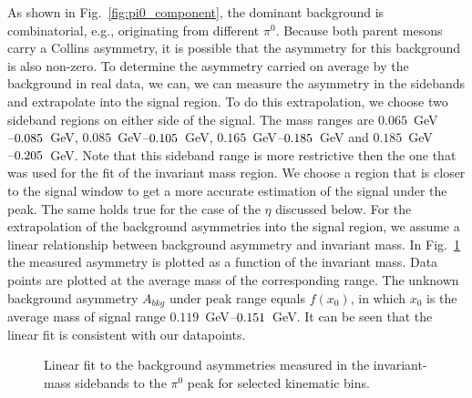 As shown in Fig.~\ref{fig:pi0_component}, the dominant background is combinatorial, e.g., originating from different $\pi^0$. Because both parent mesons carry a Collins asymmetry, it is possible that the asymmetry for this background is also non-zero. To determine the asymmetry carried on average by the background in real data, we can, we can measure the asymmetry in the sidebands and extrapolate into the signal region.
To do this extrapolation, we choose two sideband regions on either side of the signal.
The mass ranges are $0.065$~GeV$\textup{--}0.085$~GeV, $0.085$~GeV$\textup{--}0.105$~GeV, $0.165$~GeV$\textup{--}0.185$~GeV and $0.185$~GeV$\textup{--}0.205$~GeV. Note that this sideband range is more restrictive then the one that was used for the fit of the invariant mass region. We choose a region that is closer to the signal window to get a more accurate estimation of the signal under the peak. The same holds true for the case of the $\eta$ discussed below.
For the extrapolation of the background asymmetries into the signal region, we assume a linear relationship between background asymmetry and invariant mass. In Fig.~\ref{fig:bkgasy}  the measured asymmetry is plotted as a function of the invariant mass. Data points are plotted at the average mass of the corresponding range. The unknown background asymmetry $A_{bkg}$ under peak range equals $f(x_0)$, in which $x_0$ is the average mass of signal range $0.119$~GeV$\textup{--}0.151$~GeV. It can be seen that the linear fit is consistent with our datapoints.
\begin{figure}[H]
  \centering     
  \caption{ Linear fit to the background asymmetries measured in the invariant-mass sidebands to the $\pi^0$ peak for
     selected kinematic bins.}
  \label{fig:bkgasy}
\end{figure}

